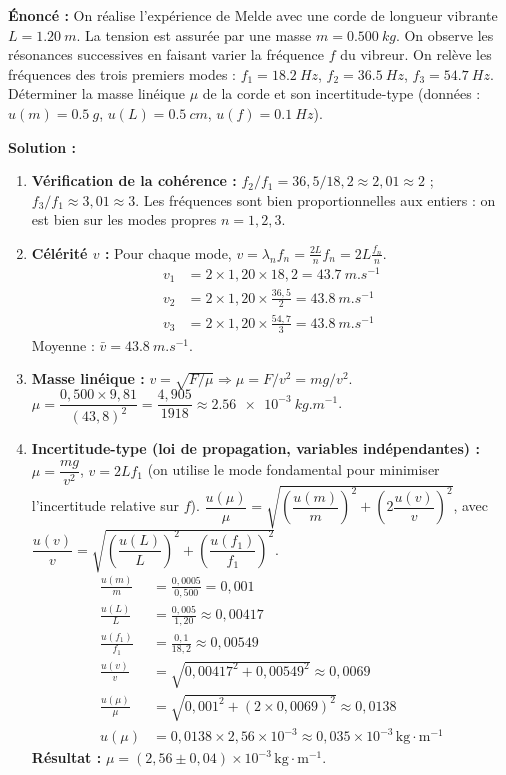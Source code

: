 \documentclass[11pt]{article}
\begin{document}
\begin{exoresolu}
\textbf{Énoncé :} On réalise l'expérience de Melde avec une corde de longueur vibrante $L=\SI{1,20}{m}$. La tension est assurée par une masse $m=\SI{0,500}{kg}$. On observe les résonances successives en faisant varier la fréquence $f$ du vibreur. On relève les fréquences des trois premiers modes : $f_1=\SI{18,2}{Hz}$, $f_2=\SI{36,5}{Hz}$, $f_3=\SI{54,7}{Hz}$. Déterminer la masse linéique $\mu$ de la corde et son incertitude-type (données : $u(m)=\SI{0,5}{g}$, $u(L)=\SI{0,5}{cm}$, $u(f)=\SI{0,1}{Hz}$).

\tcblower
\textbf{Solution :}
\begin{enumerate}
\item \textbf{Vérification de la cohérence :} $f_2/f_1 = 36,5/18,2 \approx 2,01 \approx 2$ ; $f_3/f_1 \approx 3,01 \approx 3$. Les fréquences sont bien proportionnelles aux entiers : on est bien sur les modes propres $n=1,2,3$.
\item \textbf{Célérité $v$ :} Pour chaque mode, $v = \lambda_n f_n = \frac{2L}{n} f_n = 2L \frac{f_n}{n}$.
    \begin{align*}
    v_1 &= 2\times1,20\times18,2 = \SI{43,7}{m.s^{-1}} \\
    v_2 &= 2\times1,20\times\frac{36,5}{2} = \SI{43,8}{m.s^{-1}} \\
    v_3 &= 2\times1,20\times\frac{54,7}{3} = \SI{43,8}{m.s^{-1}}
    \end{align*}
    Moyenne : $\bar{v} = \SI{43,8}{m.s^{-1}}$.
\item \textbf{Masse linéique :} $v = \sqrt{F/\mu} \Rightarrow \mu = F/v^2 = mg/v^2$.
    $\mu = \dfrac{0,500\times9,81}{(43,8)^2} = \dfrac{4,905}{1918} \approx \SI{2,56e-3}{kg.m^{-1}}$.
\item \textbf{Incertitude-type (loi de propagation, variables indépendantes) :}
    $\mu = \dfrac{mg}{v^2}$, $v = 2L f_1$ (on utilise le mode fondamental pour minimiser l'incertitude relative sur $f$).
    $\dfrac{u(\mu)}{\mu} = \sqrt{ \left(\dfrac{u(m)}{m}\right)^2 + \left(2\dfrac{u(v)}{v}\right)^2 }$, avec $\dfrac{u(v)}{v} = \sqrt{ \left(\dfrac{u(L)}{L}\right)^2 + \left(\dfrac{u(f_1)}{f_1}\right)^2 }$.
    \begin{align*}
    \frac{u(m)}{m} &= \frac{0,0005}{0,500} = 0,001 \\
    \frac{u(L)}{L} &= \frac{0,005}{1,20} \approx 0,00417 \\
    \frac{u(f_1)}{f_1} &= \frac{0,1}{18,2} \approx 0,00549 \\
    \frac{u(v)}{v} &= \sqrt{0,00417^2 + 0,00549^2} \approx 0,0069 \\
    \frac{u(\mu)}{\mu} &= \sqrt{0,001^2 + (2\times0,0069)^2} \approx 0,0138 \\
    u(\mu) &= 0,0138 \times 2,56\times10^{-3} \approx 0,035\times10^{-3}\,\text{kg}\cdot\text{m}^{-1}
    \end{align*}
    \textbf{Résultat :} $\boxed{\mu = (2,56 \pm 0,04)\times10^{-3}\,\text{kg}\cdot\text{m}^{-1}}$.
\end{enumerate}
\end{exoresolu}
\end{document}

